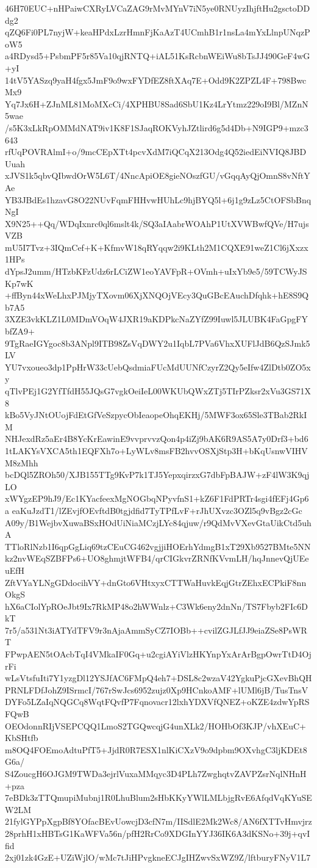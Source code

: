 46H70EUC+nHPaiwCXRyLVCaZAG9rMvMYnV7iN5ye0RNUyzIhjftHu2gsctoDDdg2
qZQ6Fi0PL7nyjW+keaHPdxLzrHmnFjKaAzT4UCmhB1r1nsLa4mYxLlnpUNqzPoW5
a4RDysd5+PsbmPF5r85Va10qjRNTQ+iAL51KsRcbnWEiWu8bTsJJ490GeF4wG+yI
14tV5YASzq9yaH4fgx5JmF9o9wxFYDfEZ8ftXAq7E+Odd9K2ZPZL4F+798BwcMx9
Yq7Jx6H+ZJnML81MoMXcCi/4XPHBU8Sad6SbU1Kz4LrYtmz229oI9Bl/MZnN5wae
/s5K3xLkRpOMMdNAT9iv1K8F1SJaqROKVyhJZtlird6g5d4Db+N9IGP9+mzc3643
rfUqPOVRAlmI+o/9mcCEpXTt4pcvXdM7iQCqX213Odg4Q52iedEiNVIQ8JBDUuah
xJVS1k5qbvQIbwdOrW5L6T/4NncApiOE8gieNOszfGU/vGqqAyQjOmnS8vNftYAe
YB3JBdEs1hzavG8O22NUvFqmFHHvwHUhLc9hjBYQ5l+6j1g9zLz5CtOFSbBnqNgI
X9N25++Qq/WDqIxnrc0ql6mslt4k/SQ3aIAabrWOAhP1UtXVWBwfQVe/H7ujsVZB
mU5I7Tvz+3IQmCef+K+KfmvW18qRYqqw2i9KLth2M1CQXE91weZ1Cl6jXxzx1HPs
dYpsJ2umm/HTzbKFzUdz6rLCiZW1eoYAVFpR+OVmh+uIxYb9e5/59TCWyJSKp7wK
+ffByn44xWeLhxPJMjyTXovm06XjXNQOjVEcy3QuGBcEAuchDfqhk+hE8S9Qb7A5
3XZE3vkKLZ1L0MDmVOqW4JXR19aKDPkcNaZYfZ99Iuwl5JLUBK4FaGpgFYbfZA9+
9TgRaeIGYgoc8b3ANpl9ITB98ZsVqDWY2u1IqbL7PVa6VhxXUFlJdB6QzSJmk5LV
YU7vxoueo3dp1PpHrW33cUebQsdmiaFUcMdUUNfCzyrZ2Qy5eIfw4ZlDtb0ZO5xy
qTlvPEj1G2YfTfdH55JQsG7vgkOeiIeL00WKUbQWxZTj5TIrPZksr2xVu3GS71X8
kBo5VyJNtOUojFdEtGfVeSzpycObIeaopeOhqEKHj/5MWF3ox65Sle3TBab2RkIM
NHJexdRz5aEr4B8YcKrEawinE9vvprvvzQon4p4iZj9bAK6R9AS5A7y0Drf3+bd6
1tLAKYsVXCA5th1EQFXh7o+LyWLv8msFB2hvvOSXjStp3H+bKqUsnwVIHVM8zMhh
bcDQl5ZROh50/XJB155TTg9KvP7k1TJ5YepxqirzxG7dbFpBAJW+zF4lW3K9qjLO
xWYgzEP9hJ9/Ec1KYacfeexMgNOGbqNPyvfnS1+kZ6F1FdPRTr4sgi4fEFj4Gp6a
eaKuJzdT1/lZEvjfOEvftdB0tgjdfid7TyTPfLvF+rJhUXvzc3OZl5q9vBgz2cGc
A09y/B1WejbvXuwaBSxHOdUiNiaMCzjLYc84qjuw/r9QdMvVXevGtaUikCtd5uhA
TTloRlNzb1I6qpGgLiq69tzCEuCG462vgjjiHOErhYdmgB1xT29Xb9527BMte5NN
kz2nvWEqSZBFPs6+UO8ghmjtWFB4/qrCIGkvrZRNfKVvmLH/hqJnnevQjUEeuEfH
ZftVYaYLNgGDdocihVY+dnGto6VHtxyxCTTWaHuvkEqjGtrZEhxECPkiF8nnOkgS
hX6aCIolYpROeJbt9Ix7RkMP48o2hWWnlz+C3Wk6eny2dnNn/TS7Fbyb2FIc6DkT
7r5/a531Nt3iATYdTFV9r3nAjaAmmSyCZ7IOBb++cvilZGJLfJJ9eiaZSe8PsWRT
FPwpAEN5tOAcbTqI4VMkaIF0Gq+u2cgiAYiVlzHKYnpYxArArBgpOwrTtD4OjrFi
wLsVtsfuIti7Y1yzgDl12YSJfAC6FMpQ4eh7+DSL8c2wzaV42YgkuPjcGXevBhQH
PRNLFDfJohZ9ISrmcI/767rSwJcs6952zujz0Xp9HCnkoAMF+lUMl6jB/TusTnsV
DYFo5LZaIqNQGCq8WqtFQvfP7Fqnovacr12lxhYDXVfQNEZ+oKZE4zdwYpRSFQwB
OEOdonnRIjVSEPCQQ1LmoS2TGQwcqjG4unXLk2/HOHbOf3KJP/vhXEuC+KbSHtfb
m8OQ4FOEmoAdtuPfT5+JjdR0R7ESX1nlKiCXzV9o9dpbm9OXvhgC3ljKDEt8G6a/
S4ZoucgH6OJGM9TWDa3ejrlVuxaMMqyc3D4PLh7ZwghqtvZAVPZsrNqlNHnH+pza
7eBDk3zTTQmupiMubnj1R0LhuBlum2sHbKKyYWlLMLbjgRvE6AfqdVqKYuSEW2LM
21fylGYPpXgpBf8YOfacBEvUowcjD3cfN7m/IISdlE2Mk2Wc8/AN6fXTTvHmvjrz
28prhH1xHBTsG1KaWFVa56n/pfH2RrCo9XDGInYYJ36IK6A3dKSNo+39j+qvIfid
2xj01zk4GzE+UZiWjlO/wMc7tJiHPvgkneECJgIHZwvSxWZ9Z/lftburyFNyV1L7
